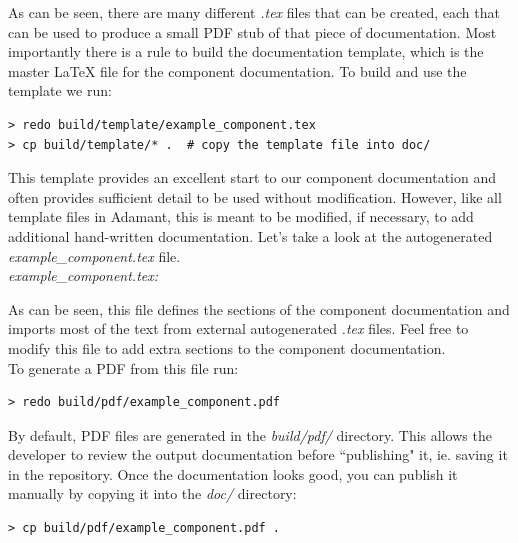 As can be seen, there are many different \textit{.tex} files that can be created, each that can be used to produce a small PDF stub of that piece of documentation. Most importantly there is a rule to build the documentation template, which is the master \LaTeX{} file for the component documentation. To build and use the template we run:

\vspace{5mm} %
\begin{verbatim}
> redo build/template/example_component.tex
> cp build/template/* .  # copy the template file into doc/
\end{verbatim}
\vspace{5mm} %

This template provides an excellent start to our component documentation and often provides sufficient detail to be used without modification. However, like all template files in Adamant, this is meant to be modified, if necessary, to add additional hand-written documentation. Let's take a look at the autogenerated \textit{example\_component.tex} file. \\

\textit{example\_component.tex:}

As can be seen, this file defines the sections of the component documentation and imports most of the text from external autogenerated \textit{.tex} files. Feel free to modify this file to add extra sections to the component documentation. \\

To generate a PDF from this file run:

\vspace{5mm} %
\begin{verbatim}
> redo build/pdf/example_component.pdf
\end{verbatim}
\vspace{5mm} %

By default, PDF files are generated in the \textit{build/pdf/} directory. This allows the developer to review the output documentation before ``publishing" it, ie. saving it in the repository. Once the documentation looks good, you can publish it manually by copying it into the \textit{doc/} directory:

\vspace{5mm} %
\begin{verbatim}
> cp build/pdf/example_component.pdf .
\end{verbatim}
\vspace{5mm} %

